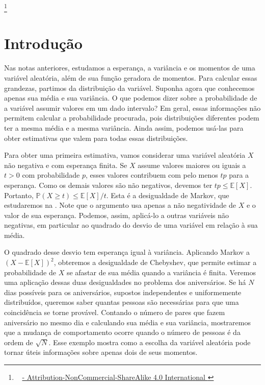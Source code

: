 \documentclass[12pt,portuguese]{article}
\newcommand\blfootnote[1]{%
\begingroup
\renewcommand\thefootnote{}\footnote{#1}%
\addtocounter{footnote}{-1}%
\endgroup
}
\theoremstyle{definition}
\theoremstyle{plainexercise}
\theoremstyle{starredexercise}
\theoremstyle{definition}
\begin{document}
\blfootnote{%
\doclicenseImage[imagewidth=2.6em]\ 
\begingroup
\hypersetup{urlcolor=darkgray}
\href{\doclicenseURL}{%
\doclicenseName - Attribution-NonCommercial-ShareAlike 4.0 International%
}%
\endgroup
}

\section{Introdução}\label{sec:introducao}

Nas notas anteriores, estudamos a esperança, a variância e os momentos de
uma variável aleatória, além de sua função geradora de momentos. Para calcular
essas grandezas, partimos da distribuição da variável. Suponha agora que
conhecemos apenas sua média e sua variância. O que podemos dizer sobre a
probabilidade de a variável assumir valores em um dado intervalo? Em geral,
essas informações não permitem calcular a probabilidade procurada, pois
distribuições diferentes podem ter a mesma média e a mesma variância. Ainda
assim, podemos usá-las para obter estimativas que valem para todas essas
distribuições.

Para obter uma primeira estimativa, vamos considerar uma variável aleatória
$X$ não negativa e com esperança finita. Se $X$ assume valores maiores ou
iguais a $t>0$ com probabilidade $p$, esses valores contribuem com pelo menos
$tp$ para a esperança. Como os demais valores são não negativos, devemos ter
$tp\leqslant\mathbb{E}[X]$. Portanto,
$\mathbb{P}(X\geqslant t)\leqslant\mathbb{E}[X]/t$. Esta é a desigualdade
de Markov, que estudaremos na \Cref{sec:markov-chebyshev}. Note que o argumento
usa apenas a não negatividade de $X$ e o valor de sua esperança. Podemos,
assim, aplicá-lo a outras variáveis não negativas, em particular ao quadrado
do desvio de uma variável em relação à sua média.

O quadrado desse desvio tem esperança igual à variância. Aplicando Markov a
$(X-\mathbb{E}[X])^2$, obteremos a desigualdade de Chebyshev, que permite
estimar a probabilidade de $X$ se afastar de sua média quando a variância é
finita. Veremos uma aplicação dessas duas desigualdades no problema dos
aniversários. Se há $N$ dias possíveis para os aniversários, supostos
independentes e uniformemente distribuídos, queremos saber quantas pessoas
são necessárias para que uma coincidência se torne provável. Contando o
número de pares que fazem aniversário no mesmo dia e calculando sua média e
sua variância, mostraremos que a mudança de comportamento ocorre quando o
número de pessoas é da ordem de $\sqrt N$. Esse exemplo mostra como a escolha
da variável aleatória pode tornar úteis informações sobre apenas dois de
seus momentos.
\end{document}
